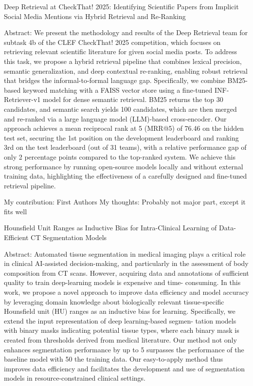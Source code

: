 Deep Retrieval at CheckThat! 2025: Identifying Scientific Papers from Implicit Social Media Mentions via Hybrid Retrieval and Re-Ranking

Abstract: We present the methodology and results of the Deep Retrieval team for subtask 4b of the CLEF CheckThat! 2025
competition, which focuses on retrieving relevant scientific literature for given social media posts. To address this
task, we propose a hybrid retrieval pipeline that combines lexical precision, semantic generalization, and deep
contextual re-ranking, enabling robust retrieval that bridges the informal-to-formal language gap. Specifically,
we combine BM25-based keyword matching with a FAISS vector store using a fine-tuned INF-Retriever-v1 model
for dense semantic retrieval. BM25 returns the top 30 candidates, and semantic search yields 100 candidates,
which are then merged and re-ranked via a large language model (LLM)-based cross-encoder.
Our approach achieves a mean reciprocal rank at 5 (MRR@5) of 76.46%
on the hidden test set, securing the 1st position on the development leaderboard and ranking 3rd on the test
leaderboard (out of 31 teams), with a relative performance gap of only 2 percentage points compared to the
top-ranked system. We achieve this strong performance by running open-source models locally and without
external training data, highlighting the effectiveness of a carefully designed and fine-tuned retrieval pipeline.

My contribution: First Authors
My thoughts: Probably not major part, except it fits well




Hounsfield Unit Ranges as Inductive Bias for Intra-Clinical Learning of Data-Efficient CT Segmentation Models

Abstract: Automated tissue segmentation in medical imaging
plays a critical role in clinical AI-assisted decision-making, and
particularly in the assessment of body composition from CT
scans. However, acquiring data and annotations of sufficient
quality to train deep-learning models is expensive and time-
consuming. In this work, we propose a novel approach to
improve data efficiency and model accuracy by leveraging domain
knowledge about biologically relevant tissue-specific Hounsfield
unit (HU) ranges as an inductive bias for learning. Specifically, we
extend the input representation of deep learning-based segmen-
tation models with binary masks indicating potential tissue types,
where each binary mask is created from thresholds derived from
medical literature. Our method not only enhances segmentation
performance by up to 5 %
surpasses the performance of the baseline model with 50 %
the training data. Our easy-to-apply method thus improves data
efficiency and facilitates the development and use of segmentation
models in resource-constrained clinical settings.



